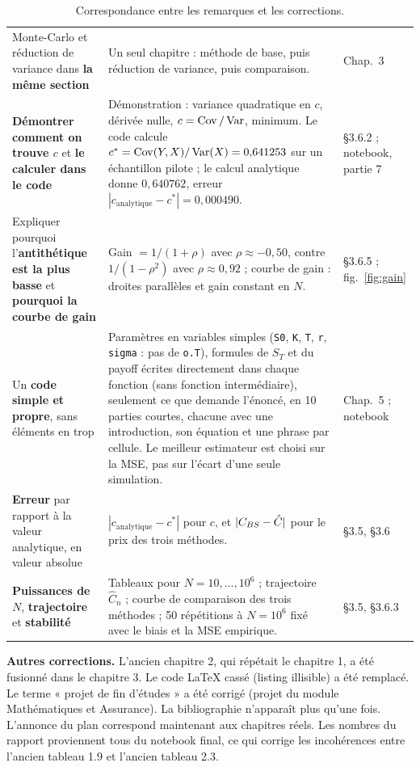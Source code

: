 \begin{table}[H]
\begin{tabularx}{\textwidth}{>{\raggedright\arraybackslash}p{4.6cm}L>{\raggedright\arraybackslash}p{2.6cm}}
\addlinespace
Monte-Carlo et réduction de variance dans \textbf{la même section} & Un seul chapitre : méthode de base, puis réduction de variance, puis comparaison. & Chap.~3 \\
\addlinespace
\textbf{Démontrer comment on trouve $c$} et \textbf{le calculer dans le code} & Démonstration : variance quadratique en $c$, dérivée nulle, $c = \operatorname{Cov}/\operatorname{Var}$, minimum. Le code calcule $c^* = \operatorname{Cov}(Y,X)/\operatorname{Var}(X) = 0{,}641253$ sur un échantillon pilote ; le calcul analytique donne $0{,}640762$, erreur $|c_{\text{analytique}} - c^*| = 0{,}000490$. & §3.6.2 ; notebook, partie 7 \\
\addlinespace
Expliquer pourquoi l'\textbf{antithétique est la plus basse} et \textbf{pourquoi la courbe de gain} & Gain $= 1/(1+\rho)$ avec $\rho\approx-0{,}50$, contre $1/(1-\rho^2)$ avec $\rho\approx0{,}92$ ; courbe de gain : droites parallèles et gain constant en $N$. & §3.6.5 ; fig.~\ref{fig:gain} \\
\addlinespace
Un \textbf{code simple et propre}, sans éléments en trop & Paramètres en variables simples (\texttt{S0}, \texttt{K}, \texttt{T}, \texttt{r}, \texttt{sigma} : pas de \texttt{o.T}), formules de $S_T$ et du payoff écrites directement dans chaque fonction (sans fonction intermédiaire), seulement ce que demande l'énoncé, en 10 parties courtes, chacune avec une introduction, son équation et une phrase par cellule. Le meilleur estimateur est choisi sur la MSE, pas sur l'écart d'une seule simulation. & Chap.~5 ; notebook \\
\addlinespace
\textbf{Erreur} par rapport à la valeur analytique, en valeur absolue & $|c_{\text{analytique}} - c^*|$ pour $c$, et $|C_{BS} - \hat C|$ pour le prix des trois méthodes. & §3.5, §3.6 \\
\addlinespace
\textbf{Puissances de $N$}, \textbf{trajectoire} et \textbf{stabilité} & Tableaux pour $N = 10, \dots, 10^6$ ; trajectoire $\hat C_n$ ; courbe de comparaison des trois méthodes ; 50 répétitions à $N = 10^6$ fixé avec le biais et la MSE empirique. & §3.5, §3.6.3 \\
\bottomrule
\end{tabularx}
\caption{Correspondance entre les remarques et les corrections.}
\end{table}

\textbf{Autres corrections.} L'ancien chapitre 2, qui répétait le chapitre 1, a été fusionné dans le chapitre 3. Le code LaTeX cassé (listing illisible) a été remplacé. Le terme « projet de fin d'études » a été corrigé (projet du module Mathématiques et Assurance). La bibliographie n'apparaît plus qu'une fois. L'annonce du plan correspond maintenant aux chapitres réels. Les nombres du rapport proviennent tous du notebook final, ce qui corrige les incohérences entre l'ancien tableau 1.9 et l'ancien tableau 2.3.
